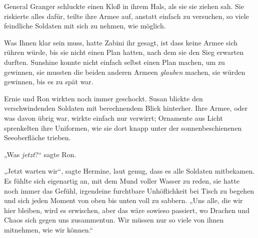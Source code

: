 General Granger schluckte einen Kloß in ihrem Hals, als sie sie ziehen sah. Sie riskierte alles dafür, teilte ihre Armee auf, anstatt einfach zu versuchen, so viele feindliche Soldaten mit sich zu nehmen, wie möglich.

Was Ihnen klar sein muss, hatte Zabini ihr gesagt, ist dass keine Armee sich rühren würde, bis sie nicht einen Plan hatten, nach dem sie den Sieg erwarten durften. Sunshine konnte nicht einfach selbst einen Plan machen, um zu gewinnen, sie mussten die beiden anderen Armeen \emph{glauben} machen, sie würden gewinnen, bis es zu spät war.

Ernie und Ron wirkten noch immer geschockt. Susan blickte den verschwindenden Soldaten mit berechnendem Blick hinterher. Ihre Armee, oder was davon übrig war, wirkte einfach nur verwirrt; Ornamente aus Licht sprenkelten ihre Uniformen, wie sie dort knapp unter der sonnenbeschienenen Seeoberfläche trieben.

„Was \emph{jetzt}?“ sagte Ron.

„Jetzt warten wir“, sagte Hermine, laut genug, dass es alle Soldaten mitbekamen. Es fühlte sich eigenartig an, mit dem Mund voller Wasser zu reden, sie hatte noch immer das Gefühl, irgendeine furchtbare Unhöflichkeit bei Tisch zu begehen und sich jeden Moment von oben bis unten voll zu sabbern. „Uns alle, die wir hier bleiben, wird es erwischen, aber das wäre sowieso passiert, wo Drachen und Chaos sich gegen uns zusammentun. Wir müssen nur so viele von ihnen mitnehmen, wie wir können.“

